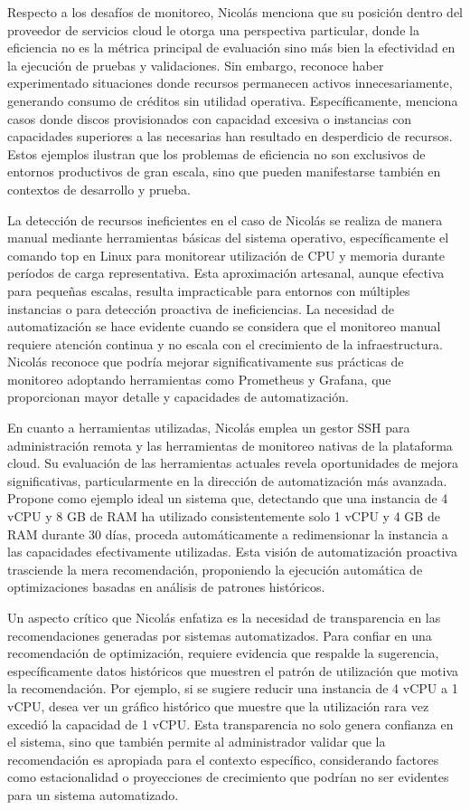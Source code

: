 Respecto a los desafíos de monitoreo, Nicolás menciona que su posición dentro del proveedor de servicios cloud le otorga una perspectiva particular, donde la eficiencia no es la métrica principal de evaluación sino más bien la efectividad en la ejecución de pruebas y validaciones. Sin embargo, reconoce haber experimentado situaciones donde recursos permanecen activos innecesariamente, generando consumo de créditos sin utilidad operativa. Específicamente, menciona casos donde discos provisionados con capacidad excesiva o instancias con capacidades superiores a las necesarias han resultado en desperdicio de recursos. Estos ejemplos ilustran que los problemas de eficiencia no son exclusivos de entornos productivos de gran escala, sino que pueden manifestarse también en contextos de desarrollo y prueba.

La detección de recursos ineficientes en el caso de Nicolás se realiza de manera manual mediante herramientas básicas del sistema operativo, específicamente el comando top en Linux para monitorear utilización de CPU y memoria durante períodos de carga representativa. Esta aproximación artesanal, aunque efectiva para pequeñas escalas, resulta impracticable para entornos con múltiples instancias o para detección proactiva de ineficiencias. La necesidad de automatización se hace evidente cuando se considera que el monitoreo manual requiere atención continua y no escala con el crecimiento de la infraestructura. Nicolás reconoce que podría mejorar significativamente sus prácticas de monitoreo adoptando herramientas como Prometheus y Grafana, que proporcionan mayor detalle y capacidades de automatización.

En cuanto a herramientas utilizadas, Nicolás emplea un gestor SSH para administración remota y las herramientas de monitoreo nativas de la plataforma cloud. Su evaluación de las herramientas actuales revela oportunidades de mejora significativas, particularmente en la dirección de automatización más avanzada. Propone como ejemplo ideal un sistema que, detectando que una instancia de 4 vCPU y 8 GB de RAM ha utilizado consistentemente solo 1 vCPU y 4 GB de RAM durante 30 días, proceda automáticamente a redimensionar la instancia a las capacidades efectivamente utilizadas. Esta visión de automatización proactiva trasciende la mera recomendación, proponiendo la ejecución automática de optimizaciones basadas en análisis de patrones históricos.

Un aspecto crítico que Nicolás enfatiza es la necesidad de transparencia en las recomendaciones generadas por sistemas automatizados. Para confiar en una recomendación de optimización, requiere evidencia que respalde la sugerencia, específicamente datos históricos que muestren el patrón de utilización que motiva la recomendación. Por ejemplo, si se sugiere reducir una instancia de 4 vCPU a 1 vCPU, desea ver un gráfico histórico que muestre que la utilización rara vez excedió la capacidad de 1 vCPU. Esta transparencia no solo genera confianza en el sistema, sino que también permite al administrador validar que la recomendación es apropiada para el contexto específico, considerando factores como estacionalidad o proyecciones de crecimiento que podrían no ser evidentes para un sistema automatizado.

